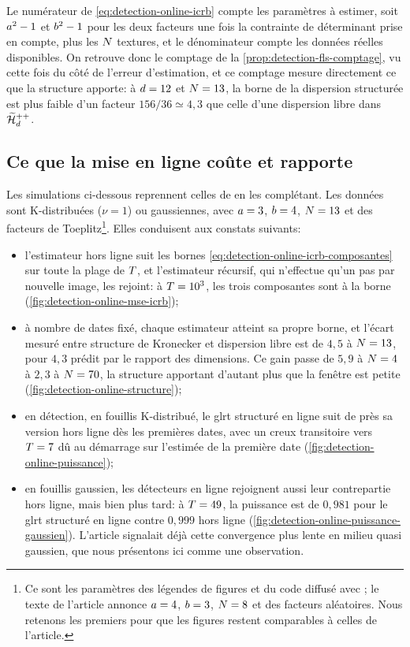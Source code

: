 Le numérateur de \cref{eq:detection-online-icrb} compte les paramètres à estimer, soit $a^2-1$ et $b^2-1$ pour les deux facteurs une fois la contrainte de déterminant prise en compte, plus les $N$ textures, et le dénominateur compte les données réelles disponibles. On retrouve donc le comptage de la \cref{prop:detection-fls-comptage}, vu cette fois du côté de l'erreur d'estimation, et ce comptage mesure directement ce que la structure apporte: à $d=12$ et $N=13$, la borne de la dispersion structurée est plus faible d'un facteur $156/36\simeq4{,}3$ que celle d'une dispersion libre dans $\widetilde{\mathcal{H}}_{d}^{++}$.

\subsection{Ce que la mise en ligne coûte et rapporte}

Les simulations ci-dessous reprennent celles de \cite{SP24} en les complétant. Les données sont K-distribuées ($\nu=1$) ou gaussiennes, avec $a=3$, $b=4$, $N=13$ et des facteurs de Toeplitz\footnote{Ce sont les paramètres des légendes de figures et du code diffusé avec \cite{SP24}; le texte de l'article annonce $a=4$, $b=3$, $N=8$ et des facteurs aléatoires. Nous retenons les premiers pour que les figures restent comparables à celles de l'article.}. Elles conduisent aux constats suivants:
\begin{itemize}
  \item l'estimateur hors ligne suit les bornes \cref{eq:detection-online-icrb-composantes} sur toute la plage de $T$, et l'estimateur récursif, qui n'effectue qu'un pas par nouvelle image, les rejoint: à $T=10^3$, les trois composantes sont à la borne (\cref{fig:detection-online-mse-icrb});
  \item à nombre de dates fixé, chaque estimateur atteint sa propre borne, et l'écart mesuré entre structure de Kronecker et dispersion libre est de $4{,}5$ à $N=13$, pour $4{,}3$ prédit par le rapport des dimensions. Ce gain passe de $5{,}9$ à $N=4$ à $2{,}3$ à $N=70$, la structure apportant d'autant plus que la fenêtre est petite (\cref{fig:detection-online-structure});
  \item en détection, en fouillis K-distribué, le glrt structuré en ligne suit de près sa version hors ligne dès les premières dates, avec un creux transitoire vers $T=7$ dû au démarrage sur l'estimée de la première date (\cref{fig:detection-online-puissance});
  \item en fouillis gaussien, les détecteurs en ligne rejoignent aussi leur contrepartie hors ligne, mais bien plus tard: à $T=49$, la puissance est de $0{,}981$ pour le glrt structuré en ligne contre $0{,}999$ hors ligne (\cref{fig:detection-online-puissance-gaussien}). L'article signalait déjà cette convergence plus lente en milieu quasi gaussien, que nous présentons ici comme une observation.
\end{itemize}

